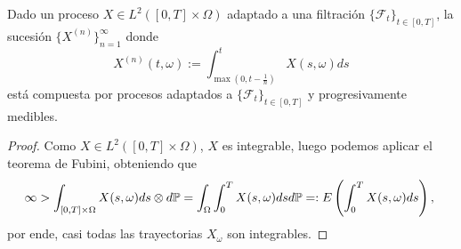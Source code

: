 \begin{lema}
    Dado un proceso $X\in L^2([0,T]\times\Omega)$ adaptado a una filtración $\{\mathcal{F}_t\}_{t\in[0,T]}$, la sucesión $\{X^{(n)}\}_{n=1}^{\infty}$ donde
    \begin{equation}
        X^{(n)}(t,\omega):=\int_{\max(0,t-\frac{1}{n})}^{t}X(s,\omega)ds
    \end{equation}
    está compuesta por procesos adaptados a $\{\mathcal{F}_t\}_{t\in[0,T]}$ y progresivamente medibles.
\end{lema}
\begin{proof}
    Como $X\in L^2([0,T]\times\Omega)$, $X$ es integrable, luego podemos aplicar el teorema de Fubini, obteniendo que
    \begin{equation}
        \infty>\int_{[0,T]\times\Omega}X(s,\omega)ds\otimes d\mathbb{P}=\int_{\Omega}\int_{0}^{T}X(s,\omega)dsd\mathbb{P}=:E\left(\int_{0}^{T}X(s,\omega)ds\right)\text{, }
    \end{equation}
    por ende, casi todas las trayectorias $X_\omega$ son integrables. %


\end{proof}
